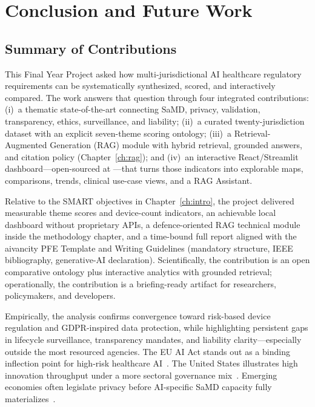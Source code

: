 \chapter{Conclusion and Future Work}
\label{ch:conclusion}

\section{Summary of Contributions}
\label{sec:contrib}

This Final Year Project asked how multi-jurisdictional AI healthcare regulatory requirements can be systematically synthesized, scored, and interactively compared. The work answers that question through four integrated contributions: (i)~a thematic state-of-the-art connecting SaMD, privacy, validation, transparency, ethics, surveillance, and liability; (ii)~a curated twenty-jurisdiction dataset with an explicit seven-theme scoring ontology; (iii)~a Retrieval-Augmented Generation (RAG) module with hybrid retrieval, grounded answers, and citation policy (Chapter~\ref{ch:rag}); and (iv)~an interactive React/Streamlit dashboard---open-sourced at \repoLink{} ---that turns those indicators into explorable maps, comparisons, trends, clinical use-case views, and a RAG Assistant.

Relative to the SMART objectives in Chapter~\ref{ch:intro}, the project delivered measurable theme scores and device-count indicators, an achievable local dashboard without proprietary APIs, a defence-oriented RAG technical module inside the methodology chapter, and a time-bound full report aligned with the aivancity PFE Template and Writing Guidelines (mandatory structure, IEEE bibliography, generative-AI declaration). Scientifically, the contribution is an open comparative ontology plus interactive analytics with grounded retrieval; operationally, the contribution is a briefing-ready artifact for researchers, policymakers, and developers.

Empirically, the analysis confirms convergence toward risk-based device regulation and GDPR-inspired data protection, while highlighting persistent gaps in lifecycle surveillance, transparency mandates, and liability clarity---especially outside the most resourced agencies. The EU AI Act stands out as a binding inflection point for high-risk healthcare AI~\cite{euaiact2024}. The United States illustrates high innovation throughput under a more sectoral governance mix~\cite{fda2021}. Emerging economies often legislate privacy before AI-specific SaMD capacity fully materializes~\cite{who2021}.

